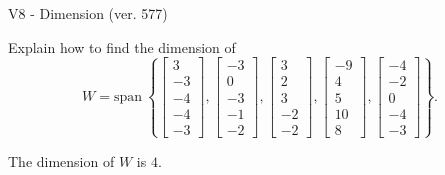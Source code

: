 \begin{exercise}
  \begin{exerciseTitle}V8 - Dimension (ver. 577)\end{exerciseTitle}
  \begin{exerciseStatement}
    Explain how to find the dimension of 
\[W=\mathrm{span}\ \left\{\left[\begin{array}{r}
3 \\
-3 \\
-4 \\
-4 \\
-3
\end{array}\right] , \left[\begin{array}{r}
-3 \\
0 \\
-3 \\
-1 \\
-2
\end{array}\right] , \left[\begin{array}{r}
3 \\
2 \\
3 \\
-2 \\
-2
\end{array}\right] , \left[\begin{array}{r}
-9 \\
4 \\
5 \\
10 \\
8
\end{array}\right] , \left[\begin{array}{r}
-4 \\
-2 \\
0 \\
-4 \\
-3
\end{array}\right]\right\}.\]



  \end{exerciseStatement}
  \begin{exerciseAnswer}
   The dimension of \(W\) is  \(4\).
  


  \end{exerciseAnswer}
\end{exercise}